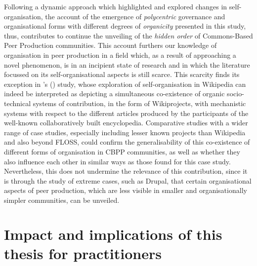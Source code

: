 Following a dynamic approach which highlighted and explored changes in self-organisation, the account of the emergence of \textit{polycentric} governance and organisational forms with different degrees of \textit{organicity} presented in this study, thus, contributes to continue the unveiling of the \textit{hidden order} \parencite{viegas2007hidden} of Commons-Based Peer Production communities. This account furthers our knowledge of organisation in peer production in a field which, as a result of approaching a novel phenomenon, is in an incipient state of research and in which the literature focussed on its self-organisational aspects is still scarce. This scarcity finds its exception in \citeauthor{forte2009decentralization}'s (\citeyear{forte2009decentralization}) study, whose exploration of self-organisation in Wikipedia can indeed be interpreted as depicting a simultaneous co-existence of organic socio-technical systems of contribution, in the form of Wikiprojects, with mechanistic systems with respect to the different articles produced by the participants of the well-known collaboratively built encyclopedia. Comparative studies with a wider range of case studies, especially including lesser known projects than Wikipedia and also beyond FLOSS, could confirm the generalisability of this co-existence of different forms of organisation in CBPP communities, as well as whether they also influence each other in similar ways as those found for this case study. Nevertheless, this does not undermine the relevance of this contribution, since it is through the study of extreme cases, such as Drupal, that certain organisational aspects of peer production, which are less visible in smaller and organisationally simpler communities, can be unveiled.

\section{Impact and implications of this thesis for practitioners}
\label{sec:conc:implications}


